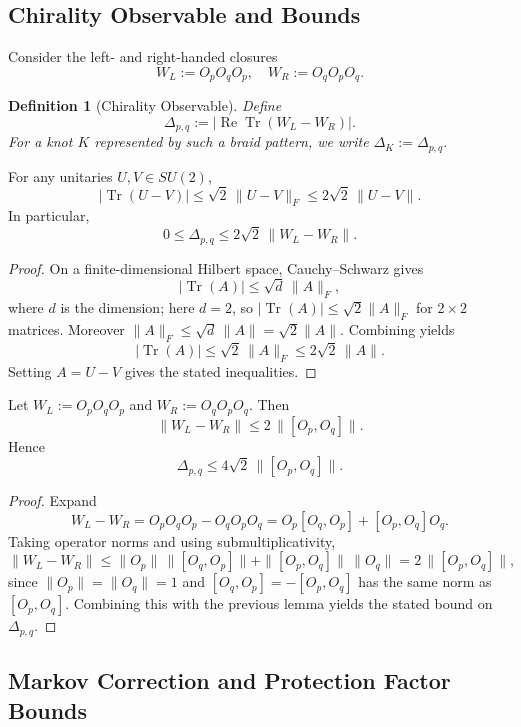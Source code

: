 \documentclass[11pt]{article}
\newtheorem{definition}[theorem]{Definition}
\theoremstyle{remark}
\begin{document}
\subsection{Chirality Observable and Bounds}

Consider the left- and right-handed closures
\[
  W_L := O_p O_q O_p,\quad
  W_R := O_q O_p O_q.
\]

\begin{definition}[Chirality Observable]
Define
\[
  \Delta_{p,q} := \bigl|
    \operatorname{Re}\operatorname{Tr}(W_L - W_R)
  \bigr|.
\]
For a knot $K$ represented by such a braid pattern, we write
$\Delta_K:=\Delta_{p,q}$.
\end{definition}

\begin{lemma}
For any unitaries $U,V\in SU(2)$,
\[
  |\operatorname{Tr}(U-V)|
  \le \sqrt{2}\,\|U-V\|_F
  \le 2\sqrt{2}\,\|U-V\|.
\]
In particular,
\[
  0 \le \Delta_{p,q} \le 2\sqrt{2}\,\|W_L-W_R\|.
\]
\end{lemma}

\begin{proof}
On a finite-dimensional Hilbert space, Cauchy--Schwarz gives
\[
  |\operatorname{Tr}(A)| \le \sqrt{d}\,\|A\|_F,
\]
where $d$ is the dimension; here $d=2$, so
$|\operatorname{Tr}(A)|\le\sqrt{2}\|A\|_F$ for $2\times 2$ matrices.
Moreover $\|A\|_F\le\sqrt{d}\,\|A\| = \sqrt{2}\|A\|$. Combining yields
\[
  |\operatorname{Tr}(A)| \le \sqrt{2}\,\|A\|_F
  \le 2\sqrt{2}\,\|A\|.
\]
Setting $A=U-V$ gives the stated inequalities.
\end{proof}

\begin{lemma}
Let $W_L := O_p O_q O_p$ and $W_R := O_q O_p O_q$. Then
\[
  \|W_L - W_R\|
  \le
  2\,\|[O_p,O_q]\|.
\]
Hence
\[
  \Delta_{p,q} \le 4\sqrt{2}\,\|[O_p,O_q]\|.
\]
\end{lemma}

\begin{proof}
Expand
\[
  W_L - W_R
  = O_p O_q O_p - O_q O_p O_q
  = O_p[O_q,O_p] + [O_p,O_q]O_q.
\]
Taking operator norms and using submultiplicativity,
\[
  \|W_L - W_R\|
  \le \|O_p\|\,\|[O_q,O_p]\| + \|[O_p,O_q]\|\,\|O_q\|
  = 2\,\|[O_p,O_q]\|,
\]
since $\|O_p\|=\|O_q\|=1$ and $[O_q,O_p]=-[O_p,O_q]$ has the same norm as
$[O_p,O_q]$. Combining this with the previous lemma yields the stated bound on
$\Delta_{p,q}$.
\end{proof}

\subsection{Markov Correction and Protection Factor Bounds}
\end{document}
